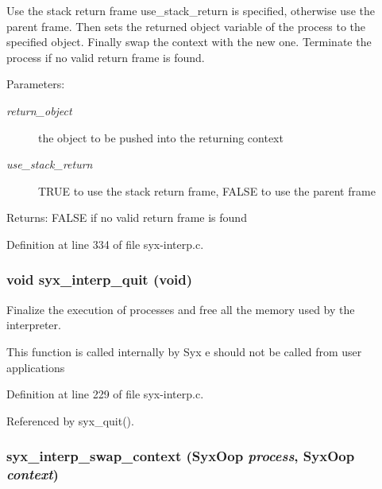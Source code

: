 Use the stack return frame use\_\-stack\_\-return is specified, otherwise use the parent frame. Then sets the returned object variable of the process to the specified object. Finally swap the context with the new one. Terminate the process if no valid return frame is found.

\begin{Desc}
\item[Parameters:]
\begin{description}
\item[{\em return\_\-object}]the object to be pushed into the returning context \item[{\em use\_\-stack\_\-return}]TRUE to use the stack return frame, FALSE to use the parent frame \end{description}
\end{Desc}
\begin{Desc}
\item[Returns:]FALSE if no valid return frame is found \end{Desc}


Definition at line 334 of file syx-interp.c.\hypertarget{syx-interp_8c_41a4fa9a3836e8750667a4134b60835f}{
\subsubsection{\setlength{\rightskip}{0pt plus 5cm}void syx\_\-interp\_\-quit (void)}}
\label{syx-interp_8c_41a4fa9a3836e8750667a4134b60835f}


Finalize the execution of processes and free all the memory used by the interpreter.

This function is called internally by Syx e should not be called from user applications 

Definition at line 229 of file syx-interp.c.

Referenced by syx\_\-quit().\hypertarget{syx-interp_8c_67ca91c8a692283098cb5b9c1da4f7ab}{
\subsubsection{ syx\_\-interp\_\-swap\_\-context ({\bf SyxOop} {\em process}, \/  {\bf SyxOop} {\em context})}}
\label{syx-interp_8c_67ca91c8a692283098cb5b9c1da4f7ab}


